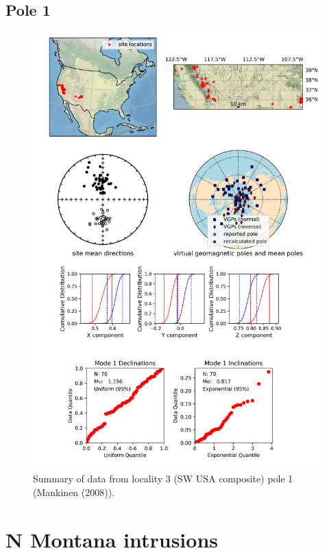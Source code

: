 \documentclass{article}
\begin{document}
\subsection{Pole 1}


\begin{figure}[H]
\centering
\includegraphics[width=5 in]{./3/1/pole_summary.png}
\caption{Summary of data from locality 3 (SW USA composite) pole 1 (Mankinen (2008)).}
\end{figure}

\section{N Montana intrusions}
\end{document}
